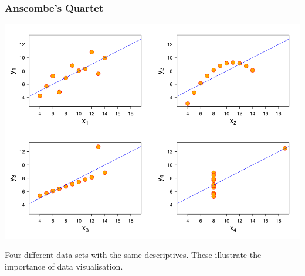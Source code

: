 \documentclass{beamer}
\begin{document}
\begin{frame}
  \frametitle{Anscombe's Quartet}

  \centering
  \includegraphics[width=.8\textwidth]{img/anscombes_quartet}

  Four different data sets with the same descriptives. These illustrate the importance of data visualisation.
\end{frame}
\end{document}
